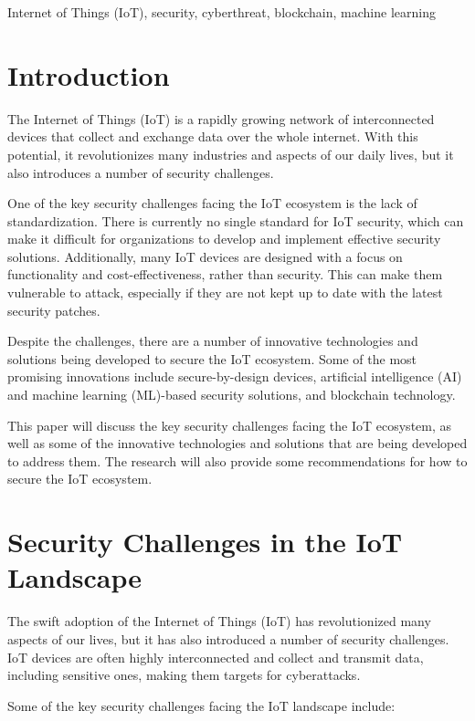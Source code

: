 \documentclass[conference]{IEEEtran}
\begin{document}
\begin{IEEEkeywords}
Internet of Things (IoT), security, cyberthreat, blockchain, machine learning
\end{IEEEkeywords}

\section{Introduction}
The Internet of Things (IoT) is a rapidly growing network of interconnected devices that collect and exchange data over the whole internet. With this potential, it revolutionizes many industries and aspects of our daily lives, but it also introduces a number of security challenges.\cite{b6}

One of the key security challenges facing the IoT ecosystem is the lack of standardization. There is currently no single standard for IoT security, which can make it difficult for organizations to develop and implement effective security solutions. Additionally, many IoT devices are designed with a focus on functionality and cost-effectiveness, rather than security. This can make them vulnerable to attack, especially if they are not kept up to date with the latest security patches.

Despite the challenges, there are a number of innovative technologies and solutions being developed to secure the IoT ecosystem. Some of the most promising innovations include secure-by-design devices, artificial intelligence (AI) and machine learning (ML)-based security solutions, and blockchain technology.

This paper will discuss the key security challenges facing the IoT ecosystem, as well as some of the innovative technologies and solutions that are being developed to address them. The research will also provide some recommendations for how to secure the IoT ecosystem.

%
\section{Security Challenges in the IoT Landscape}

The swift adoption of the Internet of Things (IoT) has revolutionized many aspects of our lives, but it has also introduced a number of security challenges. IoT devices are often highly interconnected and collect and transmit data, including sensitive ones, making them targets for cyberattacks.


Some of the key security challenges facing the IoT landscape include:
\end{document}
